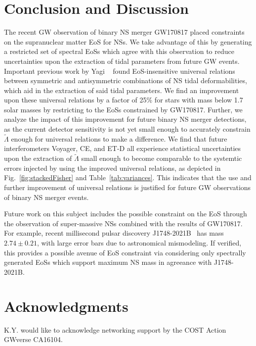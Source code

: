 \documentclass[prd,twocolumn,nofootinbib,superscriptaddress,amsmath,amssymb]{revtex4-1}
\begin{document}
\section{Conclusion and Discussion}\label{sec:conclusion}
The recent GW observation of binary NS merger GW170817 placed constraints on the supranuclear matter EoS for NSs.
We take advantage of this by generating a restricted set of spectral EoSs which agree with this observation to reduce uncertainties upon the extraction of tidal parameters from future GW events.
Important previous work by Yagi ~\cite{Yagi:ILQ,Yagi:binLove} found EoS-insensitive universal relations between symmetric and antisymmetric combinations of NS tidal deformabilities, which aid in the extraction of said tidal parameters.
We find an improvement upon these universal relations by a factor of 25\% for stars with mass below 1.7 solar masses by restricting to the EoSs constrained by GW170817.
Further, we analyze the impact of this improvement for future binary NS merger detections, as the current detector sensitivity is not yet small enough to accurately constrain $\tilde{\Lambda}$ enough for universal relations to make a difference.
We find that future interferometers Voyager, CE, and ET-D all experience statistical uncertainties upon the extraction of $\tilde{\Lambda}$ small enough to become comparable to the systemtic errors injected by using the improved universal relations, as depicted in Fig.~\ref{fig:stackedFisher} and Table~\ref{tab:variances}.
This indicates that the use and further improvement of universal relations is justified for future GW observations of binary NS merger events.

Future work on this subject includes the possible constraint on the EoS through the observation of super-massive NSs combined with the results of GW170817.
For example, recent millisecond pulsar discovery J1748-2021B~\cite{Freire:superMassiveNS} has mass $2.74 \pm 0.21$, with large error bars due to astronomical mismodeling.
If verified, this provides a possible avenue of EoS constraint via considering only spectrally generated EoSs which support maximum NS mass in agreeance with J1748-2021B.

\section*{Acknowledgments}\label{acknowledgments}
K.Y. would like to acknowledge networking support by the COST Action
GWverse CA16104. 


\end{document}

